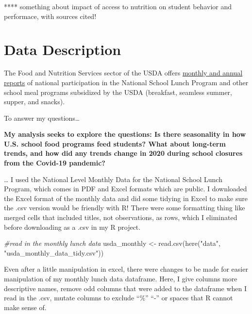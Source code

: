 \documentclass[
]{article}
\newenvironment{Shaded}{\begin{snugshade}}{\end{snugshade}}
\newcommand{\CommentTok}[1]{\textcolor[rgb]{0.56,0.35,0.01}{\textit{#1}}}
\newcommand{\FunctionTok}[1]{\textcolor[rgb]{0.00,0.00,0.00}{#1}}
\newcommand{\NormalTok}[1]{#1}
\newcommand{\OtherTok}[1]{\textcolor[rgb]{0.56,0.35,0.01}{#1}}
\newcommand{\StringTok}[1]{\textcolor[rgb]{0.31,0.60,0.02}{#1}}
\begin{document}
**** something about impact of access to nutrition on student behavior
and performace, with sources cited!

\hypertarget{data-description}{%
\section{Data Description}\label{data-description}}

The Food and Nutrition Services sector of the USDA offers
\href{https://www.fns.usda.gov/data-research}{monthly and annual
reports} of national participation in the National School Lunch Program
and other school meal programs subsidized by the USDA (breakfast,
seamless summer, supper, and snacks).

To answer my questions\ldots{}

\textbf{My analysis seeks to explore the questions: Is there seasonality
in how U.S. school food programs feed students? What about long-term
trends, and how did any trends change in 2020 during school closures
from the Covid-19 pandemic? }

\ldots{} I used the National Level Monthly Data for the National School
Lunch Program, which comes in PDF and Excel formats which are public. I
downloaded the Excel format of the monthly data and did some tidying in
Excel to make sure the .csv version would be friendly with R! There were
some formatting thing like merged cells that included titles, not
observations, as rows, which I eliminated before downloading as a .csv
in my R project.

\begin{Shaded}
\begin{Highlighting}[]
\CommentTok{\#read in the monthly lunch data }
\NormalTok{usda\_monthly }\OtherTok{\textless{}{-}} \FunctionTok{read.csv}\NormalTok{(}\FunctionTok{here}\NormalTok{(}\StringTok{"data"}\NormalTok{, }\StringTok{"usda\_monthly\_data\_tidy.csv"}\NormalTok{))}
\end{Highlighting}
\end{Shaded}

Even after a little manipulation in excel, there were changes to be made
for easier manipulation of my monthly lunch data dataframe. Here, I give
columns more descriptive names, remove odd columns that were added to
the dataframe when I read in the .csv, mutate columns to exclude ``\%''
``-'' or spaces that R cannot make sense of.
\end{document}
